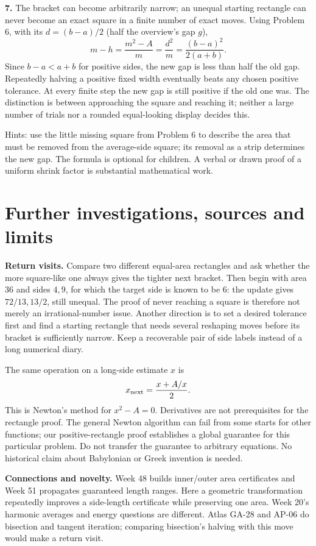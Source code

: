 \documentclass[11pt,letterpaper]{article}
\begin{document}
\textbf{7.} The bracket can become arbitrarily narrow; an unequal starting rectangle can never become an exact square in a finite number of exact moves. Using Problem 6, with its $d=(b-a)/2$ (half the overview's gap $g$),
\[m-h=\frac{m^2-A}{m}=\frac{d^2}{m}=\frac{(b-a)^2}{2(a+b)}.\]
Since $b-a<a+b$ for positive sides, the new gap is less than half the old gap. Repeatedly halving a positive fixed width eventually beats any chosen positive tolerance. At every finite step the new gap is still positive if the old one was. The distinction is between approaching the square and reaching it; neither a large number of trials nor a rounded equal-looking display decides this.

Hints: use the little missing square from Problem 6 to describe the area that must be removed from the average-side square; its removal as a strip determines the new gap. The formula is optional for children. A verbal or drawn proof of a uniform shrink factor is substantial mathematical work.
\newpage
\section*{Further investigations, sources and limits}
\textbf{Return visits.} Compare two different equal-area rectangles and ask whether the more square-like one always gives the tighter next bracket. Then begin with area $36$ and sides $4,9$, for which the target side is known to be $6$: the update gives $72/13,13/2$, still unequal. The proof of never reaching a square is therefore not merely an irrational-number issue. Another direction is to set a desired tolerance first and find a starting rectangle that needs several reshaping moves before its bracket is sufficiently narrow. Keep a recoverable pair of side labels instead of a long numerical diary.

The same operation on a long-side estimate $x$ is
\[x_{\rm next}=\frac{x+A/x}{2}.\]
This is Newton's method for $x^2-A=0$. Derivatives are not prerequisites for the rectangle proof. The general Newton algorithm can fail from some starts for other functions; our positive-rectangle proof establishes a global guarantee for this particular problem. Do not transfer the guarantee to arbitrary equations. No historical claim about Babylonian or Greek invention is needed.

\textbf{Connections and novelty.} Week 48 builds inner/outer area certificates and Week 51 propagates guaranteed length ranges. Here a geometric transformation repeatedly improves a side-length certificate while preserving one area. Week 20's harmonic averages and energy questions are different. Atlas GA-28 and AP-06 do bisection and tangent iteration; comparing bisection's halving with this move would make a return visit.
\end{document}
